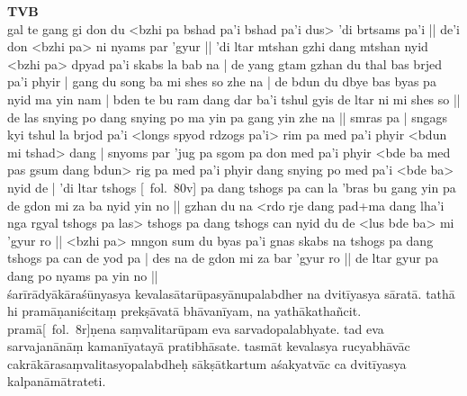 \documentclass[12pt]{article}
\begin{document}
\textbf{TVB}\\
gal te gang gi don du <bzhi pa bshad pa'i bshad pa'i dus> 'di brtsams pa'i || de'i don <bzhi pa> ni nyams par 'gyur || 'di ltar mtshan gzhi dang mtshan nyid <bzhi pa> dpyad pa'i skabs la bab na | de yang gtam gzhan du thal bas brjed pa'i phyir | gang du song ba mi shes so zhe na | de bdun du dbye bas byas pa nyid ma yin nam | bden te bu ram dang dar ba'i tshul gyis de ltar ni mi shes so || de las snying po dang snying po ma yin pa gang yin zhe na || smras pa | sngags kyi tshul la brjod pa'i <longs spyod rdzogs pa'i> rim pa med pa'i phyir <bdun mi tshad> dang | snyoms par 'jug pa sgom pa don med pa'i phyir <bde ba med pas gsum dang bdun> rig pa med pa'i phyir dang snying po med pa'i <bde ba> nyid de | 'di ltar tshogs [\TVB\ fol.\ 80v] pa dang tshogs pa can la 'bras bu gang yin pa de gdon mi za ba nyid yin no || gzhan du na <rdo rje dang pad+ma dang lha'i nga rgyal tshogs pa las> tshogs pa dang tshogs can nyid du de <lus bde ba> mi 'gyur ro || <bzhi pa> mngon sum du byas pa'i gnas skabs na tshogs pa dang tshogs pa can de yod pa | des na de gdon mi za bar 'gyur ro || de ltar gyur pa dang po nyams pa yin no || \\

śarīrādyākāraśūnyasya kevalasātarūpasyānupalabdher\footnoteB{
	°labdher] \EDD ; °bdher \MS
} na dvitīyasya sāratā. tathā hi pramāṇaniścitaṃ prekṣāvatā bhāvanīyam, na yathākathañcit. pramā[\MS\ fol.\ 8r]ṇena saṃvalitarūpam eva sarvadopalabhyate. tad eva sarvajanānāṃ kamanīyatayā pratibhāsate. tasmāt kevalasya rucyabhāvāc cakrākārasaṃvalitasyopalabdheḥ sākṣātkartum aśakyatvāc\footnoteB{
	aśakyatvāc] \EDD\ (\emd); aśakyatāc \MS
} ca dvitīyasya kalpanāmātrateti.\footnoteB{
	kalpanāmātrateti] \EDD\ (\emd); kalpanātrateti \MS
}\\
\end{document}
